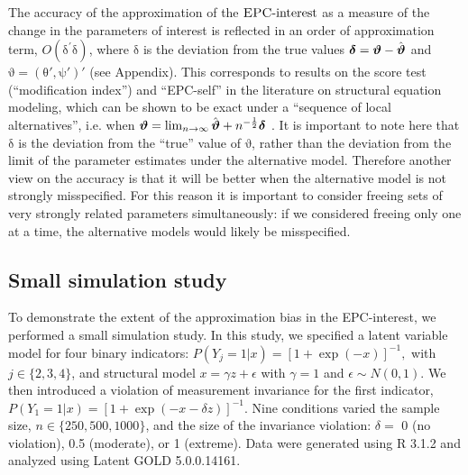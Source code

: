 \documentclass[letterpaper,12pt]{article}
\newcommand\vm[1]{%
\bm{\mathrm{#1}}}
\newcommand{\param}{\vm{\theta}}
\newcommand{\bpsi}{\vm{\psi}}
\newcommand{\da}{\textrm{{\sc {EPC}}-interest}}
\begin{document}

The accuracy of the approximation of the $\da{}$ as a measure of the change in the parameters of interest is reflected in an order of approximation term, $O(\vm{\delta}^\prime\vm{\delta})$, where $\vm{\delta}$ is the deviation from the true values  $\vm{\delta} = \vm{\vartheta} - \hat{\vm{\vartheta}}$ and $\vm{\vartheta} = (\param', \bpsi')'$ (see Appendix).  This  corresponds to results on the score test (``modification index'') and ``EPC-self'' in the literature on structural equation modeling, which can be shown to be exact under a ``sequence of local alternatives'', i.e. when $\vm{\vartheta} = \lim_{n\rightarrow\infty} \hat{\vm{\vartheta}} + n^{-\frac{1}{2}}\vm{\delta}$ \citep[p. 135]{satorra1989alternative}.
It is important to note here that $\vm{\delta}$ is the deviation from the ``true'' value of $\vm{\vartheta}$, rather than the deviation from the limit of the parameter estimates under the alternative model. Therefore another view on the accuracy is that it will be better when the alternative model is not strongly misspecified. For this reason it is important to consider freeing sets of very strongly related parameters simultaneously: if we considered freeing only one at a time, the alternative models would likely be misspecified.

\subsection{Small simulation study}
\label{sec:simulation}

To demonstrate the extent of the approximation bias in the EPC-interest, we performed a small simulation study. In this study, we specified a latent variable model for four binary indicators:
$
	P(Y_j = 1 | x) = [1 + \exp(-x)]^{-1},
$
with $j \in \{2,3,4\}$, and structural model
$
	x = \gamma z + \epsilon
$
with $\gamma = 1$ and $\epsilon \sim N(0, 1)$. We then introduced a violation of measurement invariance for the first indicator,
$
	P(Y_1 = 1 | x) = [1 + \exp(-x - \delta z)]^{-1}.
$
Nine conditions varied the sample size, $n \in \{250, 500, 1000\}$, and the size of the invariance violation:  $\delta = $ 0 (no violation), 0.5 (moderate), or 1 (extreme). 
Data were generated using R 3.1.2 and analyzed using Latent GOLD 5.0.0.14161. 
\end{document}
